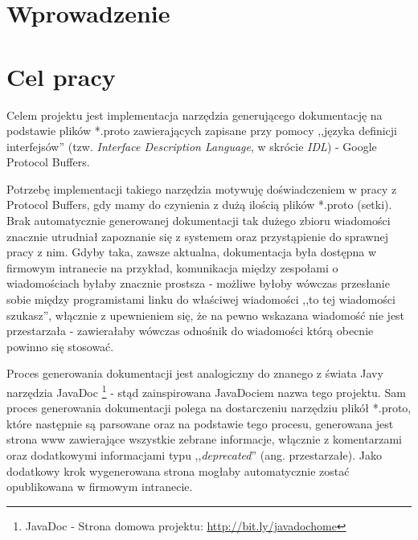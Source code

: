 \documentclass[pdflatex,11pt]{aghdpl}
\author{Konrad Malawski}
\date{2011}
\begin{document}
\titlepages

\tableofcontents
\clearpage

%

\chapter{Wprowadzenie}
\label{cha:wprowadzenie}



\chapter{Cel pracy}
\label{sec:celePracy}

Celem projektu jest implementacja narzędzia generującego dokumentację na podstawie plików 
*.proto zawierających zapisane przy pomocy ,,języka definicji interfejsów'' (tzw. \textit{Interface Description Language}, w skrócie \textit{IDL}) - Google Protocol Buffers. 


Potrzebę implementacji takiego narzędzia motywuję doświadczeniem w pracy z Protocol Buffers, gdy mamy do czynienia z dużą ilością plików *.proto (setki). 
Brak automatycznie generowanej dokumentacji tak dużego zbioru wiadomości znacznie utrudniał zapoznanie się z systemem oraz przystąpienie do sprawnej pracy z nim.
Gdyby taka, zawsze aktualna, dokumentacja była dostępna w firmowym intranecie na przykład, komunikacja między zespołami o wiadomościach byłaby znacznie prostsza - 
możliwe byłoby wówczas przesłanie sobie między programistami linku do właściwej wiadomości ,,to tej wiadomości szukasz'', włącznie z upewnieniem się, że na pewno
wskazana wiadomość nie jest przestarzała - zawierałaby wówczas odnośnik do wiadomości którą obecnie powinno się stosować.


Proces generowania dokumentacji jest analogiczny do znanego z świata Javy narzędzia JavaDoc 
\footnote[1]{JavaDoc - Strona domowa projektu: \href{http://bit.ly/javadochome}{http://bit.ly/javadochome}} - stąd zainspirowana JavaDociem nazwa tego projektu. 
Sam proces generowania dokumentacji polega na dostarczeniu narzędziu plikół *.proto, które następnie są parsowane oraz na podstawie tego procesu, 
generowana jest strona www zawierające wszystkie zebrane informacje, włącznie z komentarzami oraz dodatkowymi informacjami 
typu ,,\textit{deprecated}'' (ang. przestarzałe). Jako dodatkowy krok wygenerowana strona mogłaby automatycznie zostać opublikowana w firmowym intranecie.
\end{document}

